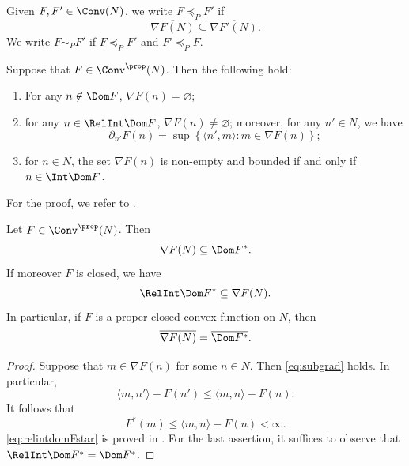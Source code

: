 \begin{definition}\label{def:convexPorder}
    Given $F,F'\in \Conv(N)$, we write $F\preceq_P F'$ if
    \[
        \overline{\nabla F(N)}\subseteq \overline{\nabla F'(N)}.
    \]
    We write $F\sim_P F'$ if $F\preceq_P F'$ and $F'\preceq_P F$.
\end{definition}

\begin{theorem}\label{thm:nablaF}
    Suppose that $F\in \Conv^{\prop}(N)$. Then the following hold:
    \begin{enumerate}
        \item\label{itm:thm:nablaF:1} For any $n\not\in \Dom F$, $\nabla F(n)=\varnothing$;
        \item\label{itm:thm:nablaF:2} for any $n\in \RelInt\Dom F$, $\nabla F(n)\neq \varnothing$; moreover, for any $n'\in N$, we have
        \[
            \partial_{n'} F(n)=\sup\left\{\langle n', m \rangle: m\in \nabla F(n)\right\};
        \]
        \item\label{itm:thm:nablaF:3} for $n\in N$, the set $\nabla F(n)$ is non-empty and bounded if and only if $n\in \Int \Dom F$.
    \end{enumerate}
\end{theorem}
For the proof, we refer to \cite[Theorem~23.4]{Roc70}.

\begin{proposition}\label{prop:gradDomFstar}
    Let $F\in \Conv^{\prop}(N)$. Then
    \[
    \nabla F(N)\subseteq \Dom F^*.
    \]
    If moreover $F$ is closed, we have
    \begin{equation}\label{eq:relintdomFstar}
        \RelInt \Dom F^*\subseteq \nabla F(N).
    \end{equation}
    In particular, if $F$ is a proper closed convex function on $N$, then
    \[
    \overline{\nabla F(N)}=\overline{\Dom F^*}.
    \]
\end{proposition}
\begin{proof}
    Suppose that $m\in \nabla F(n)$ for some $n\in N$. Then \eqref{eq:subgrad} holds. In particular,
    \[
    \langle m,n'\rangle -F(n')\leq \langle m,n\rangle-F(n).
    \]
    It follows that
    \[
    F^*(m)\leq  \langle m,n\rangle-F(n)<\infty.
    \]
    \eqref{eq:relintdomFstar} is proved in \cite[Corollary~23.5.1]{Roc70}. For the last assertion, it suffices to observe that $\overline{\RelInt \Dom F^*}=\overline{\Dom F^*}$.
\end{proof}

